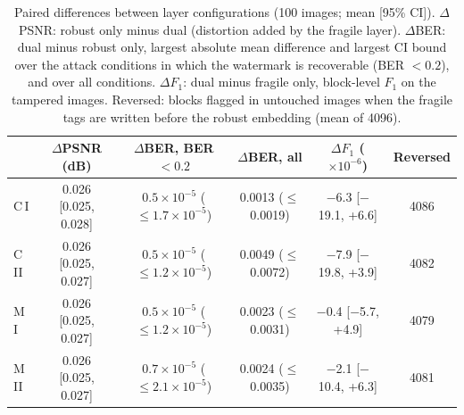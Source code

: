 \begin{table}[t]
\centering
\caption{Paired differences between layer configurations (100 images; mean [95\% CI]). $\Delta$PSNR: robust only minus dual (distortion added by the fragile layer). $\Delta$BER: dual minus robust only, largest absolute mean difference and largest CI bound over the attack conditions in which the watermark is recoverable (BER $<0.2$), and over all conditions. $\Delta F_1$: dual minus fragile only, block-level $F_1$ on the tampered images. Reversed: blocks flagged in untouched images when the fragile tags are written before the robust embedding (mean of 4096).}
\label{tab:layer_differences}
\footnotesize
\setlength{\tabcolsep}{2.5pt}
\begin{tabular}{lccccc}
\toprule
 & $\Delta$PSNR (dB) & $\Delta$BER, BER $<0.2$ & $\Delta$BER, all & $\Delta F_1$ ($\times10^{-6}$) & Reversed \\
\midrule
C\,I & 0.026 [0.025, 0.028] & $0.5\times10^{-5}$ ($\leq1.7\times10^{-5}$) & 0.0013 ($\leq$0.0019) & $-$6.3 [$-$19.1, +6.6] & 4086 \\
C\,II & 0.026 [0.025, 0.027] & $0.5\times10^{-5}$ ($\leq1.2\times10^{-5}$) & 0.0049 ($\leq$0.0072) & $-$7.9 [$-$19.8, +3.9] & 4082 \\
M\,I & 0.026 [0.025, 0.027] & $0.5\times10^{-5}$ ($\leq1.2\times10^{-5}$) & 0.0023 ($\leq$0.0031) & $-$0.4 [$-$5.7, +4.9] & 4079 \\
M\,II & 0.026 [0.025, 0.027] & $0.7\times10^{-5}$ ($\leq2.1\times10^{-5}$) & 0.0024 ($\leq$0.0035) & $-$2.1 [$-$10.4, +6.3] & 4081 \\
\bottomrule
\end{tabular}
\end{table}
